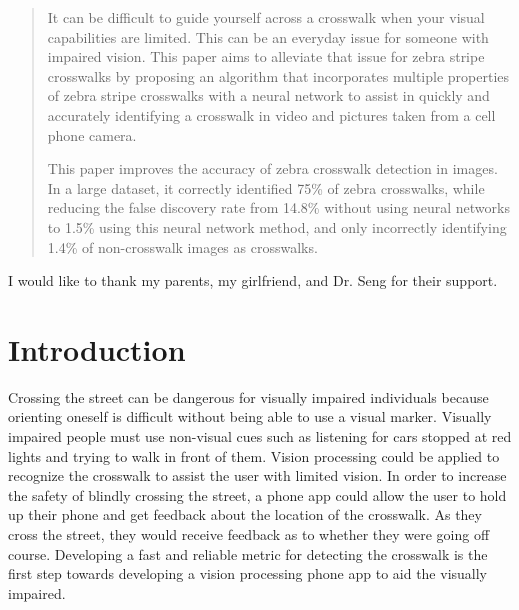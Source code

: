\documentclass[12pt]{ucthesis}
\begin{document}
\begin{frontmatter}

\copyrightpage

\committeemembershippage

\begin{abstract}
It can be difficult to guide yourself across a crosswalk when your visual capabilities are limited. This can be an everyday issue for someone with impaired vision. This paper aims to alleviate that issue for zebra stripe crosswalks by proposing an algorithm that incorporates multiple properties of zebra stripe crosswalks with a neural network to assist in quickly and accurately identifying a crosswalk in video and pictures taken from a cell phone camera.

This paper improves the accuracy of zebra crosswalk detection in images. In a large dataset, it correctly identified 75\% of zebra crosswalks, while reducing the false discovery rate from 14.8\% without using neural networks to 1.5\% using this neural network method, and only incorrectly identifying 1.4\% of non-crosswalk images as crosswalks.

\end{abstract}

\begin{acknowledgements}
I would like to thank my parents, my girlfriend, and Dr. Seng for their support.
\end{acknowledgements}


\tableofcontents


\listoftables

\listoffigures

\end{frontmatter}

\pagestyle{plain}

\renewcommand{\baselinestretch}{1.66}


\chapter{Introduction}
\label{intro}

Crossing the street can be dangerous for visually impaired individuals because orienting oneself is difficult without being able to use a visual marker. Visually impaired people must use non-visual cues such as listening for cars stopped at red lights and trying to walk in front of them. Vision processing could be applied to recognize the crosswalk to assist the user with limited vision. In order to increase the safety of blindly crossing the street, a phone app could allow the user to hold up their phone and get feedback about the location of the crosswalk. As they cross the street, they would receive feedback as to whether they were going off course. Developing a fast and reliable metric for detecting the crosswalk is the first step towards developing a vision processing phone app to aid the visually impaired.
\end{document}
